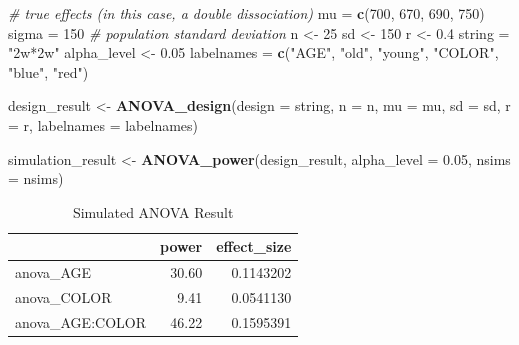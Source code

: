 \documentclass[
]{book}
\newenvironment{Shaded}{\begin{snugshade}}{\end{snugshade}}
\newcommand{\CommentTok}[1]{\textcolor[rgb]{0.56,0.35,0.01}{\textit{#1}}}
\newcommand{\DataTypeTok}[1]{\textcolor[rgb]{0.13,0.29,0.53}{#1}}
\newcommand{\DecValTok}[1]{\textcolor[rgb]{0.00,0.00,0.81}{#1}}
\newcommand{\FloatTok}[1]{\textcolor[rgb]{0.00,0.00,0.81}{#1}}
\newcommand{\KeywordTok}[1]{\textcolor[rgb]{0.13,0.29,0.53}{\textbf{#1}}}
\newcommand{\NormalTok}[1]{#1}
\newcommand{\StringTok}[1]{\textcolor[rgb]{0.31,0.60,0.02}{#1}}
\begin{document}
\begin{Shaded}
\begin{Highlighting}[]
\CommentTok{# true effects (in this case, a double dissociation)}
\NormalTok{mu =}\StringTok{ }\KeywordTok{c}\NormalTok{(}\DecValTok{700}\NormalTok{, }\DecValTok{670}\NormalTok{, }\DecValTok{690}\NormalTok{, }\DecValTok{750}\NormalTok{) }
\NormalTok{sigma =}\StringTok{ }\DecValTok{150}  \CommentTok{# population standard deviation}
\NormalTok{n <-}\StringTok{ }\DecValTok{25}
\NormalTok{sd <-}\StringTok{ }\DecValTok{150}
\NormalTok{r <-}\StringTok{ }\FloatTok{0.4}
\NormalTok{string =}\StringTok{ "2w*2w"}
\NormalTok{alpha_level <-}\StringTok{ }\FloatTok{0.05}
\NormalTok{labelnames =}\StringTok{ }\KeywordTok{c}\NormalTok{(}\StringTok{"AGE"}\NormalTok{, }\StringTok{"old"}\NormalTok{, }\StringTok{"young"}\NormalTok{, }
               \StringTok{"COLOR"}\NormalTok{, }\StringTok{"blue"}\NormalTok{, }\StringTok{"red"}\NormalTok{)}

\NormalTok{design_result <-}\StringTok{ }\KeywordTok{ANOVA_design}\NormalTok{(}\DataTypeTok{design =}\NormalTok{ string,}
                              \DataTypeTok{n =}\NormalTok{ n, }
                              \DataTypeTok{mu =}\NormalTok{ mu, }
                              \DataTypeTok{sd =}\NormalTok{ sd, }
                              \DataTypeTok{r =}\NormalTok{ r, }
                              \DataTypeTok{labelnames =}\NormalTok{ labelnames)}
\end{Highlighting}
\end{Shaded}

\begin{Shaded}
\begin{Highlighting}[]
\NormalTok{simulation_result <-}\StringTok{ }\KeywordTok{ANOVA_power}\NormalTok{(design_result, }
                                 \DataTypeTok{alpha_level =} \FloatTok{0.05}\NormalTok{, }
                                 \DataTypeTok{nsims =}\NormalTok{ nsims)}
\end{Highlighting}
\end{Shaded}

\begin{table}[!h]

\caption{\label{tab:unnamed-chunk-108}Simulated ANOVA Result}
\centering
\begin{tabular}[t]{l|r|r}
\hline
  & power & effect\_size\\
\hline
anova\_AGE & 30.60 & 0.1143202\\
\hline
anova\_COLOR & 9.41 & 0.0541130\\
\hline
anova\_AGE:COLOR & 46.22 & 0.1595391\\
\hline
\end{tabular}
\end{table}
\end{document}
